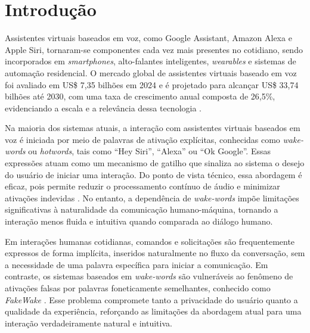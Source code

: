 \documentclass[
    12pt,                %
    openright,           %
    oneside,             %
    a4paper,             %
    english,             %
    brazil               %
]{abntex2}
\begin{document}
\tableofcontents*
\cleardoublepage

\textual

\chapter{Introdução}
\label{cap:introducao}


Assistentes virtuais baseados em voz, como Google Assistant, Amazon Alexa e Apple Siri, tornaram-se componentes cada vez mais presentes no cotidiano, sendo incorporados em \textit{smartphones}, alto-falantes inteligentes, \textit{wearables} e sistemas de automação residencial. O mercado global de assistentes virtuais baseado em voz foi avaliado em US\$ 7,35 bilhões em 2024 e é projetado para alcançar US\$ 33,74 bilhões até 2030, com uma taxa de crescimento anual composta de 26,5\%, evidenciando a escala e a relevância dessa tecnologia \cite{NMSC2025}.

Na maioria dos sistemas atuais, a interação com assistentes virtuais baseados em voz é iniciada por meio de palavras de ativação explícitas, conhecidas como \textit{wake-words} ou \textit{hotwords}, tais como ``Hey Siri'', ``Alexa'' ou ``Ok Google''. Essas expressões atuam como um mecanismo de gatilho que sinaliza ao sistema o desejo do usuário de iniciar uma interação. Do ponto de vista técnico, essa abordagem é eficaz, pois permite reduzir o processamento contínuo de áudio e minimizar ativações indevidas \cite{Garg2021}. No entanto, a dependência de \textit{wake-words} impõe limitações significativas à naturalidade da comunicação humano-máquina, tornando a interação menos fluida e intuitiva quando comparada ao diálogo humano.

Em interações humanas cotidianas, comandos e solicitações são frequentemente expressos de forma implícita, inseridos naturalmente no fluxo da conversação, sem a necessidade de uma palavra específica para iniciar a comunicação. Em contraste, os sistemas baseados em \textit{wake-words} são vulneráveis ao fenômeno de ativações falsas por palavras foneticamente semelhantes, conhecido como \textit{FakeWake} \cite{Chen2021}. Esse problema compromete tanto a privacidade do usuário quanto a qualidade da experiência, reforçando as limitações da abordagem atual para uma interação verdadeiramente natural e intuitiva.
\end{document}
